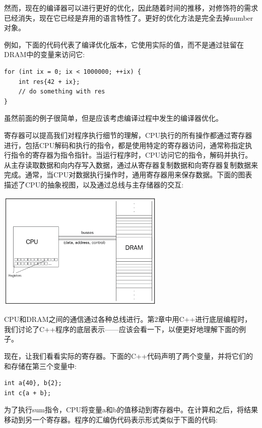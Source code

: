 然而，现在的编译器可以进行更好的优化，因此随着时间的推移，对修饰符的需求已经消失，现在它已经是弃用的语言特性了。更好的优化方法是完全去掉number对象。 \par
例如，下面的代码代表了编译优化版本，它使用实际的值，而不是通过驻留在DRAM中的变量来访问它: \par

\begin{lstlisting}[caption={}]
for (int ix = 0; ix < 1000000; ++ix) {
	int res{42 + ix};
	// do something with res
}
\end{lstlisting}

虽然前面的例子很简单，但是应该考虑编译过程中发生的编译器优化。 \par
寄存器可以提高我们对程序执行细节的理解，CPU执行的所有操作都通过寄存器进行，包括CPU解码和执行的指令，都是使用特定的寄存器访问，通常称指定执行指令的寄存器为指令指针。当运行程序时，CPU访问它的指令，解码并执行。从主存读取数据和向内存写入数据，通过从寄存器复制数据和向寄存器复制数据来完成。通常，当CPU对数据执行操作时，通用寄存器用来保存数据。下面的图表描述了CPU的抽象视图，以及通过总线与主存储器的交互: \par

\begin{center}
	\includegraphics[width=0.6\textwidth]{content/Section-1/Chapter-5/6}
\end{center}

CPU和DRAM之间的通信通过各种总线进行。第2章中用C++进行底层编程时，我们讨论了C++程序的底层表示——应该会看一下，以便更好地理解下面的例子。 \par
现在，让我们看看实际的寄存器。下面的C++代码声明了两个变量，并将它们的和存储在第三个变量中: \par

\begin{lstlisting}[caption={}]
int a{40}, b{2};
int c{a + b};
\end{lstlisting}

为了执行sum指令，CPU将变量a和b的值移动到寄存器中。在计算和之后，将结果移动到另一个寄存器。程序的汇编伪代码表示形式类似于下面的代码: \par

